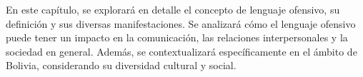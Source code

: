En este capítulo, se explorará en detalle el concepto de lenguaje ofensivo, su definición y sus diversas manifestaciones. Se analizará cómo el lenguaje ofensivo puede tener un impacto en la comunicación, las relaciones interpersonales y la sociedad en general. Además, se contextualizará específicamente en el ámbito de Bolivia, considerando su diversidad cultural y social.
